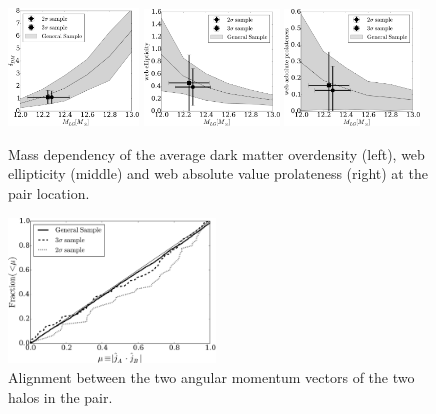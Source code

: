 \documentclass{emulateapj}
\begin{document}
\begin{figure}
\begin{center}
  \includegraphics[width=0.31\textwidth]{median_mass_overdensity.pdf} 
  \includegraphics[width=0.32\textwidth]{median_mass_ellipticity.pdf} 
  \includegraphics[width=0.32\textwidth]{median_mass_prolateness.pdf} 
\caption{Mass dependency of the average dark matter overdensity (left),
  web ellipticity (middle) and web absolute value prolateness (right) at the
  pair location.
\label{fig:median_overdensity}}
\end{center}
\end{figure}


\begin{figure}
\begin{center}
  \includegraphics[width=0.49\textwidth]{alignments_jj_all_environments.pdf}
\end{center}
\caption{Alignment between the two angular momentum vectors of the two
  halos in the pair.
    \label{fig:jj_alignment}}  
\end{figure}
\end{document}

